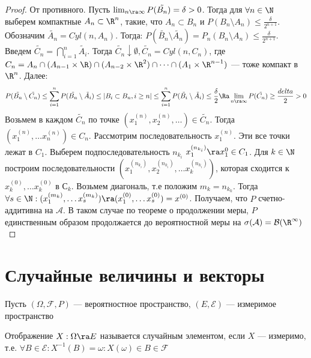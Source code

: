 \begin{proof}
    От противного. Пусть \(\lim_{n \ra \infty} P(\tilde{B_n}) = \delta > 0\). Тогда для \(\forall n \in \N\) выберем компактные \(A_n \subset \R^n\), такие, что \(A_n \subset B_n\) и \(P(B_n \setminus A_n) \le \frac{\delta}{2^{n + 1}}\). Обозначим \(\tilde{A_n} = Cyl(n, A_n)\). Тогда: \(P(\tilde{B_n} \setminus \tilde{A_n}) = P_n(B_n \setminus A_n) \le \frac{\delta}{2^{n + 1}}\). Введем \(\tilde{C_n} = \bigcap_{i = 1}^n \tilde{A_i}\). Тогда \(\tilde{C_n} \downarrow \emptyset, \tilde{C_n} = Cyl(n, C_n)\), где \(C_n = A_n \cap (A_{n - 1} \times \R) \cap (A_{n - 2} \times \R^2) \cap \dots \cap (A_{1} \times \R^{n - 1})\) --- тоже компакт в \(\R^n\). Далее:
    \[P(\tilde{B_n} \setminus \tilde{C_n}) \le \sum_{i = 1}^n P(\tilde{B_n} \setminus \tilde{A_i}) \le |B_i \subset B_n, i \ge n| \le \sum_{i = 1}^n P(\tilde{B_i} \setminus \tilde{A_i}) \le \frac{\delta}{2} \Ra \lim_{n \ra \infty} P(\tilde{C_n}) \ge \frac{delta}{2} > 0\]
    Возьмем в каждом \(\tilde{C_n}\) по точке \((x_1^{(n)}, x_2^{(n)}, \dots) \in \tilde{C_n}\). Тогда \((x_1^{(n)}, \dots x_n^{(n)}) \in C_n\). Рассмотрим последовательность \(x_1^{(n)}\). Эти все точки лежат в \(C_1\). Выберем подпоследовательность \(n_{k_i}\)  \(x_1^{(n_{k_i})} \ra x_1^0 \in C_1\). Для \(k \in \N\) построим последовательности \((x_1^{(n_{k_i})}, x_2^{(n_{k_i})}, \dots x_k^{(n_{k_i})})\), которая сходится к \(x^{(0)}_k, \dots x^{(0)}_k\) в \(С_k\). Возьмем диагональ, т.е положим \(m_k = n_{k_k}\). Тогда \(\forall s \in \N: (x_1^{(m_k)}, \dots x_s^{(m_k)}) \ra (x_1^{(0)}, \dots x_s^{(0)})= x^{(0)}\). Получаем, что \(P\) счетно-аддитивна на \(\mathcal{A}\). В таком случае по теореме о продолжении меры, \(P\) единственным образом продолжается до вероятностной меры на \(\sigma(\mathcal{A}) = \mathcal{B}(\R^\infty)\)
\end{proof}


\section{Случайные величины и векторы}
Пусть \((\Omega, \mathcal{F}, P)\) --- вероятностное пространство, \((E, \mathcal{E})\) --- измеримое пространство

\begin{definition}
    Отображение \(X: \Omega \ra E\) называется случайным элементом, если \(X\) --- измеримо, т.е. \(\forall B \in \mathcal{E}: X^{-1}(B) = {\omega: X(\omega) \in B} \in \mathcal{F}\)
\end{definition}

